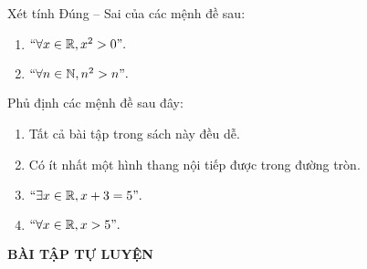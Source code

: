 \begin{vd}%
	Xét tính Đúng -- Sai của các mệnh đề sau:
	\begin{enumerate}
		\item $``\forall x\in \mathbb{R}, x^2>0".$
		\item $``\forall n\in \mathbb{N}, n^2>n".$
	\end{enumerate}
\end{vd}

\begin{vd}%
	Phủ định các mệnh đề sau đây:
	\begin{enumerate}
		\item Tất cả bài tập trong sách này đều dễ.
		\item Có ít nhất một hình thang nội tiếp được trong đường tròn.
		\item $``\exists x\in \mathbb{R},x+3=5".$
		\item $``\forall x\in \mathbb{R},x>5".$
	\end{enumerate}
\end{vd}
\begin{center}
	\textbf{BÀI TẬP TỰ LUYỆN }
\end{center}

